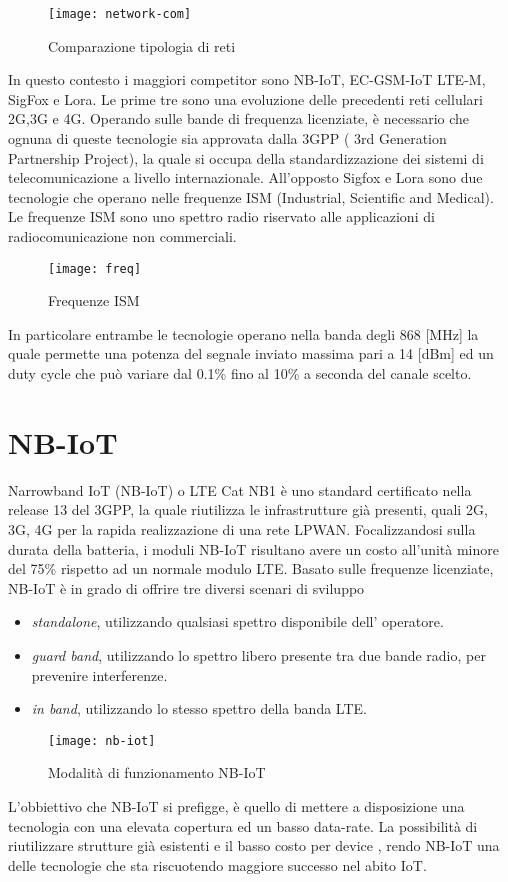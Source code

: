 \begin{figure}[ht]
    \centering 
        \texttt{[image: network-com]}
    \caption{Comparazione tipologia di reti}
\end{figure}

In questo contesto i maggiori competitor sono  NB-IoT, EC-GSM-IoT
LTE-M, SigFox e Lora. Le prime tre  sono una evoluzione delle precedenti reti
cellulari 2G,3G e 4G. Operando sulle bande di frequenza licenziate, è necessario
che ognuna di queste tecnologie sia approvata dalla 3GPP ( 3rd Generation
Partnership Project), la quale si occupa della standardizzazione dei sistemi di
telecomunicazione a livello internazionale.
All'opposto Sigfox e Lora sono due tecnologie che operano nelle frequenze ISM
(Industrial, Scientific and Medical). Le frequenze ISM sono uno spettro radio
riservato alle applicazioni di radiocomunicazione non commerciali.

\begin{figure}[ht]
    \centering 
        \texttt{[image: freq]}
    \caption{Frequenze ISM}
\end{figure}

In particolare entrambe le tecnologie operano  nella banda degli 868 [MHz]
la quale permette una potenza del segnale inviato massima pari a 14 [dBm] ed un
duty cycle che può variare dal 0.1\% fino al 10\% a seconda del canale scelto.
 
\section{NB-IoT}
Narrowband IoT (NB-IoT) o LTE Cat NB1 è uno standard certificato nella release 13 del 3GPP, la
quale riutilizza le infrastrutture già presenti, quali 2G, 3G, 4G per la rapida
realizzazione di una rete LPWAN.
Focalizzandosi sulla durata della batteria, i moduli NB-IoT risultano avere un
costo all'unità minore del 75\% rispetto ad un normale modulo LTE.
Basato sulle frequenze licenziate, NB-IoT è in grado di
offrire tre diversi scenari di sviluppo \cite{NB-white_paper}
\begin{itemize}
\item \emph{standalone}, utilizzando qualsiasi spettro disponibile dell'
operatore.
\item \emph{guard band}, utilizzando lo spettro libero presente tra due bande
radio, per prevenire interferenze.
\item \emph{in band}, utilizzando lo stesso spettro della banda LTE.
\end{itemize}
\begin{figure}[ht]
    \centering 
        \texttt{[image: nb-iot]}
    \caption{Modalità di funzionamento NB-IoT}
\end{figure}
L'obbiettivo che NB-IoT si prefigge, è quello di mettere a disposizione una
tecnologia con una elevata copertura ed un basso data-rate. La possibilità di
riutilizzare strutture già esistenti e il basso costo per device , rendo
NB-IoT una delle tecnologie che sta riscuotendo maggiore successo nel abito IoT.




